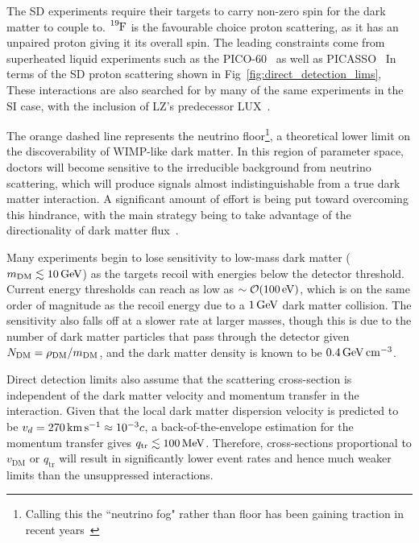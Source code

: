 The SD experiments require their targets to carry non-zero spin for the dark matter to couple to. 
$\ce{^{19}F}$ is the favourable choice proton scattering, as it has an unpaired proton giving it its overall spin.
The leading constraints come from superheated liquid experiments such as the PICO-60~\cite{PICO:2019vsc_jul_Darkmattersearch} as well as PICASSO~\cite*{Behnke:2016lsk_apr_FinalResultsPICASSO}
In terms of the SD proton scattering shown in Fig~\ref{fig:direct_detection_lims},
These interactions are also searched for by many of the same experiments in the SI case, with the inclusion of
LZ's predecessor LUX~\cite{LUX:2017ree_jun_LimitsspindependentWIMPnucleon}.

The orange dashed line represents the neutrino floor\footnote{Calling this the ``neutrino fog" rather than floor has been gaining traction in recent years~\cite{OHare:2021utq_dec_Foghorizonnew}}, a theoretical lower limit on the discoverability of WIMP-like dark matter. In this region of parameter space, doctors will become sensitive to the irreducible background from neutrino scattering, which will produce signals almost indistinguishable from a true dark matter interaction. A significant amount of effort is being put toward overcoming this hindrance, with the main strategy being to take advantage of the directionality of dark matter flux~\cite{Grothaus:2014hja_jun_DirectionalDarkMatter}.

Many experiments begin to lose sensitivity to low-mass dark matter ($m_\mathrm{DM}\lesssim 10{\rm \,GeV}$) as the targets recoil with energies below the detector threshold. Current energy thresholds can reach as low as $\sim {\cal O} (100{\rm \,eV})$, which is on the same order of magnitude as the recoil energy due to a $1{\rm \,GeV}$ dark matter collision. The sensitivity also falls off at a slower rate at larger masses, though this is due to the number of dark matter particles that pass through the detector given $N_\mathrm{DM} = \rho_\mathrm{DM}/m_\mathrm{DM}$, and the dark matter density is known to be $0.4{\rm \,GeV} {\rm \,cm}^{-3}$.

Direct detection limits also assume that the scattering cross-section is independent of the dark matter velocity and momentum transfer in the interaction. Given that the local dark matter dispersion velocity is predicted to be $v_d = 270{\rm \,km}{\rm \,s}^{-1} \approx 10^{-3}c$, a back-of-the-envelope estimation for the momentum transfer gives $q_\mathrm{tr}\lesssim 100 {\rm \,MeV}$. Therefore, cross-sections proportional to $v_\mathrm{DM}$ or $q_\mathrm{tr}$ will result in significantly lower event rates and hence much weaker limits than the unsuppressed interactions. 

